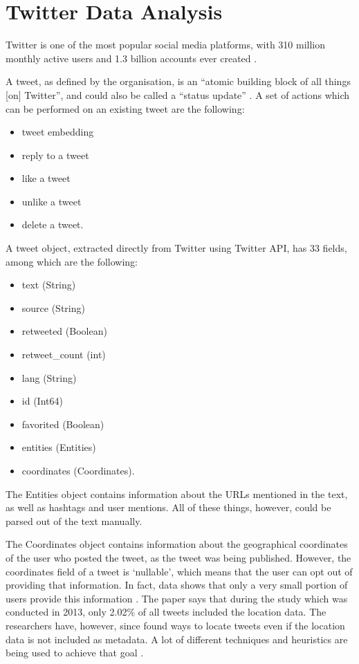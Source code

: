 \section{Twitter Data Analysis}
\label{sec:twitter_analysis}

Twitter is one of the most popular social media platforms, with 310 million monthly active users and 1.3 billion accounts ever created \cite{twittertcstats, twitterbistats}. 

A tweet, as defined by the organisation, is an ``atomic building block of all things [on] Twitter'', and could also be called a ``status update'' \cite{twitterapi}. A set of actions which can be performed on an existing tweet are the following: 
\begin{itemize}
    \item tweet embedding
    \item reply to a tweet
    \item like a tweet
    \item unlike a tweet
    \item delete a tweet.
\end{itemize} 

A tweet object, extracted directly from Twitter using Twitter API, has 33 fields, among which are the following: 

\begin{itemize}
    \item text (String)
    \item source (String)
    \item retweeted (Boolean)
    \item retweet\_count (int)
    \item lang (String)
    \item id (Int64)
    \item favorited (Boolean)
    \item entities (Entities)
    \item coordinates (Coordinates).
\end{itemize}

The Entities object contains information about the URLs mentioned in the text, as well as hashtags and user mentions. All of these things, however, could be parsed out of the text manually. 

The Coordinates object contains information about the geographical coordinates of the user who posted the tweet, as the tweet was being published. However, the coordinates field of a tweet is `nullable', which means that the user can opt out of providing that information. In fact, data shows that only a very small portion of users provide this information \cite{leetaru2013mapping}. The paper says that during the study which was conducted in 2013, only 2.02\% of all tweets included the location data. The researchers have, however, since found ways to locate tweets even if the location data is not included as metadata. A lot of different techniques and heuristics are being used to achieve that goal \cite{leetaru2013mapping, han2014text}.

